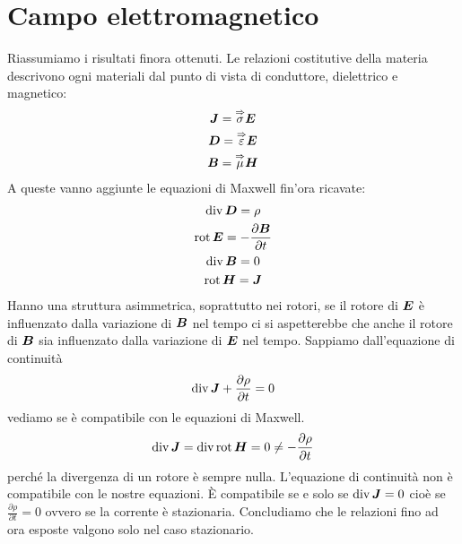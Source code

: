 \chapter{Campo elettromagnetico}
\minitoc
Riassumiamo i risultati finora ottenuti. Le relazioni costitutive della materia descrivono ogni materiali dal punto di vista di conduttore, dielettrico e magnetico:
\begin{subequations}
\begin{gather}
\boldsymbol{J}=\overset{\Rightarrow}{\sigma}\boldsymbol{E}\\
\boldsymbol{D}=\overset{\Rightarrow}{\varepsilon}\boldsymbol{E}\\
\boldsymbol{B}=\overset{\Rightarrow}{\mu}\boldsymbol{H}
\end{gather}
\end{subequations}
A queste vanno aggiunte le equazioni di Maxwell fin'ora ricavate:
\begin{subequations}
\begin{gather}
\operatorname{div}\boldsymbol{D}=\rho\\
\operatorname{rot}\boldsymbol{E}=-\frac{\partial\boldsymbol{B}}{\partial t}\\
\operatorname{div}\boldsymbol{B}=0\\
\operatorname{rot}\boldsymbol{H}=\boldsymbol{J}
\end{gather}
\end{subequations}
Hanno una struttura asimmetrica, soprattutto nei rotori, se il rotore di $\boldsymbol{E}$ è influenzato dalla variazione di $\boldsymbol{B}$ nel tempo ci si aspetterebbe che anche il rotore di $\boldsymbol{B}$ sia influenzato dalla variazione di $\boldsymbol{E}$ nel tempo. Sappiamo dall'equazione di continuità
\begin{equation}
\operatorname{div}\boldsymbol{J}+\frac{\partial\rho}{\partial t}=0
\end{equation}
vediamo se è compatibile con le equazioni di Maxwell.
\begin{equation}
\operatorname{div}\boldsymbol{J}=\operatorname{div}\operatorname{rot}\boldsymbol{H}=0\neq -\frac{\partial\rho}{\partial t}
\end{equation}
perché la divergenza di un rotore è sempre nulla. L'equazione di continuità non è compatibile con le nostre equazioni. \`E compatibile se e solo se $\operatorname{div}\boldsymbol{J}=0$ cioè se $\frac{\partial\rho}{\partial t}=0$ ovvero se la corrente è stazionaria. Concludiamo che le relazioni fino ad ora esposte valgono solo nel caso stazionario.
